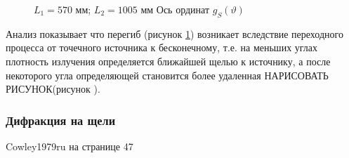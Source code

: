 \begin{figure}[H]
  \centering
  \hfill
  \hfill
  \hfill
  \caption{$L_1 = 570$ мм; $L_2 = 1005 $ мм \textcolor{mygreen}{ Ось ординат $g_S(\vartheta)$}}
  \label{ris:calc_slits_ability_res}
\end{figure}

Анализ показывает что перегиб (рисунок \ref{ris:calc_slits_ability_res}) возникает вследствие переходного
процесса от точечного источника к бесконечному, т.е. на меньших углах плотность излучения определяется ближайшей
щелью к источнику, а после некоторого угла определяющей становится более удаленная \textcolor{mygreen}{НАРИСОВАТЬ РИСУНОК}(рисунок ).

\subsubsection{Дифракция на щели}
  Cowley1979ru на странице 47
